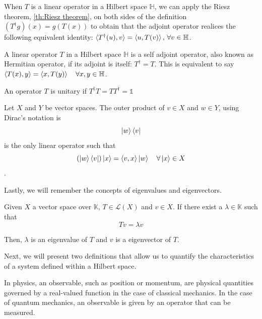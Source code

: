 When $T$ is a linear operator in a Hilbert space $\mathbb{H}$, we can apply the Riesz theorem, \autoref{th:Riesz theorem}, on both sides of the definition $(T^\dag g)(x) = g(T(x))$ to obtain that the adjoint operator realices the following equivalent identity: $\braket{T^\dag (u) , v} = \braket{u, T(v)}, \, \forall v \in \mathbb{H}$.


\begin{definicion}
    A linear operator $T$ in a Hilbert space $\mathbb{H}$ is a self adjoint operator, also known as Hermitian operator, if its adjoint is itself: $T^\dag =T$. This is equivalent to say $\braket{T(x), y} = \braket{x, T(y)} \quad \forall x, y \in \mathbb{H}$.
\end{definicion}

\begin{definicion}
    An operator $T$ is unitary if $T^\dag T = T T^\dag = \mathbb{1}$
\end{definicion}

\begin{definicion} 
    Let $X$ and $Y$ be vector spaces. The outer product of $v \in X$ and $w \in Y$, using Dirac's notation is $$\ket{w} \bra{v}$$ is the only linear operator such that 
    $$(\ket{w} \bra{v}) \ket{x} = \braket{v,x} \ket{w} \quad \forall \ket{x} \in X$$.
\end{definicion}

Lastly, we will remember the concepts of eigenvalues and eigenvectors.

\begin{definicion}
    Given $X$ a vector space over $\mathbb{K}$, $T \in \mathcal{L}(X)$ and $v \in X$. If there exist a $\lambda \in \mathbb{K}$ such that
    \begin{equation}
        T v = \lambda v
    \end{equation}

    Then, $\lambda$ is an eigenvalue of $T$ and $v$ is a eigenvector of $T$. 
\end{definicion}

Next, we will present two definitions that allow us to quantify the characteristics of a system defined within a Hilbert space.

\begin{definicion}[Observable]
    In physics, an observable, such as position or momentum, are physical quantities governed by a real-valued function in the case of classical mechanics. In the case of quantum mechanics, an observable is given by an operator that can be measured. 
\end{definicion}

